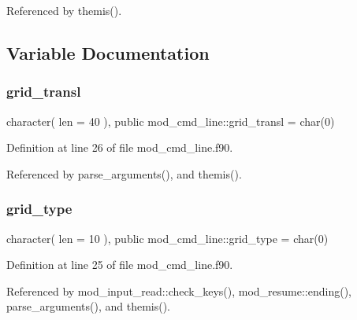 Referenced by themis().



\subsection{Variable Documentation}
\mbox{\label{namespacemod__cmd__line_a63a7d7fabb7e0819c6f88e792f327d80}} 
\subsubsection{\texorpdfstring{grid\+\_\+transl}{grid\_transl}}
{\footnotesize\ttfamily character( len = 40 ), public mod\+\_\+cmd\+\_\+line\+::grid\+\_\+transl = char(0)}



Definition at line 26 of file mod\+\_\+cmd\+\_\+line.\+f90.



Referenced by parse\+\_\+arguments(), and themis().

\mbox{\label{namespacemod__cmd__line_a8395cb7a13a767c9f0b8e4d6b0b5bbbe}} 
\subsubsection{\texorpdfstring{grid\+\_\+type}{grid\_type}}
{\footnotesize\ttfamily character( len = 10 ), public mod\+\_\+cmd\+\_\+line\+::grid\+\_\+type = char(0)}



Definition at line 25 of file mod\+\_\+cmd\+\_\+line.\+f90.



Referenced by mod\+\_\+input\+\_\+read\+::check\+\_\+keys(), mod\+\_\+resume\+::ending(), parse\+\_\+arguments(), and themis().

\mbox{\label{namespacemod__cmd__line_ae265e832b5cdb62595a1e0c2339c7e80}} 

